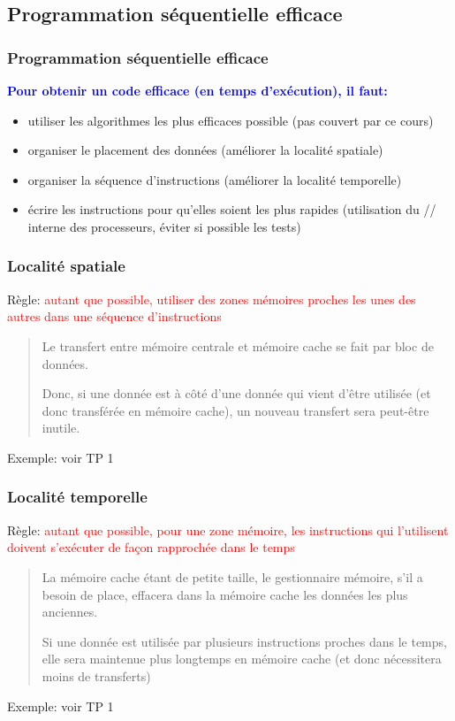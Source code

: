 \documentclass{beamer}
\begin{document}
\begin{frame}
\section{Programmation s\'equentielle efficace}
\frametitle{Programmation s\'equentielle efficace}

\bf
\textcolor{blue}{Pour obtenir un code efficace (en temps d'ex\'ecution), il faut:}

\begin{itemize}
	\item utiliser les algorithmes les plus efficaces possible (pas couvert par ce cours)
	
	\item organiser le placement des donn\'ees (am\'eliorer la localit\'e spatiale)
	
	\item organiser la s\'equence d'instructions (am\'eliorer la localit\'e temporelle)

	\item \'ecrire les instructions pour qu'elles soient les plus rapides (utilisation du // interne des processeurs, \'eviter si possible les tests)
\end{itemize}
\end{frame}

\begin{frame}
\frametitle{Localit\'e spatiale}
Règle:  \textcolor{red}{autant que possible, utiliser des zones m\'emoires proches les unes des autres dans une s\'equence d'instructions}
\begin{quote}
	Le transfert entre m\'emoire centrale et m\'emoire cache se fait par bloc de donn\'ees.
	
	Donc, si une donn\'ee est \`a c\^ot\'e d'une donn\'ee qui vient d'\^etre utilis\'ee (et donc transf\'er\'ee en m\'emoire cache), un nouveau transfert sera peut-\^etre inutile.
\end{quote}

\vfill
Exemple: voir TP 1
\end{frame}

\begin{frame}
\frametitle{Localit\'e temporelle}
Règle: 
	\textcolor{red}{autant que possible, pour une zone m\'emoire, les instructions qui l'utilisent doivent s'ex\'ecuter de façon rapproch\'ee dans le temps}
	
	\begin{quote}
		La m\'emoire cache \'etant de petite taille, le gestionnaire m\'emoire, s'il a besoin de place, effacera dans la m\'emoire cache les donn\'ees les plus anciennes.
		
		Si une donn\'ee est utilis\'ee par plusieurs instructions proches dans le temps, elle sera maintenue plus longtemps en m\'e\-moi\-re cache (et donc n\'ecessitera moins de transferts)
	\end{quote}
Exemple: voir TP 1
\end{frame}
\end{document}
